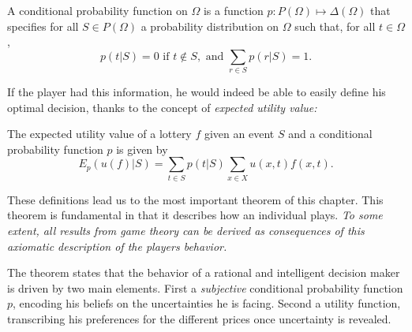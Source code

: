 \begin{definition}
A conditional probability function on $\Omega$ is a function $p : P(\Omega) \mapsto \Delta(\Omega)$ that specifies for all $S \in P(\Omega)$ a probability distribution on $\Omega$ such that, for all $t \in \Omega$,
$$ p(t|S) =  0 \text{ if } t \not \in S, \text{ and } \sum_{r \in S} p(r| S) = 1.$$
\end{definition}

If the player had this information, he would indeed be able to easily define his optimal decision, thanks to the concept of \emph{expected utility value:}

\begin{definition}
The expected utility value of a lottery $f$ given an event $S$ and a conditional probability function $p$ is given by
$$ E_p(u(f)|S) = \sum_{t \in S} p(t|S) \sum_{x \in X} u(x,t) f(x,t).$$
\end{definition}

These definitions lead us to the most important theorem of this chapter. This theorem is fundamental in that it describes how an individual plays.  \emph{To some extent, all results from game theory can be derived as consequences of this axiomatic description of the players behavior.
}


The theorem states that the behavior of a rational and intelligent decision maker is driven by two main elements. First a \emph{subjective} conditional probability function $p$, encoding his beliefs on the uncertainties he is facing. Second a utility function, transcribing his preferences for the different prices once uncertainty is revealed.


